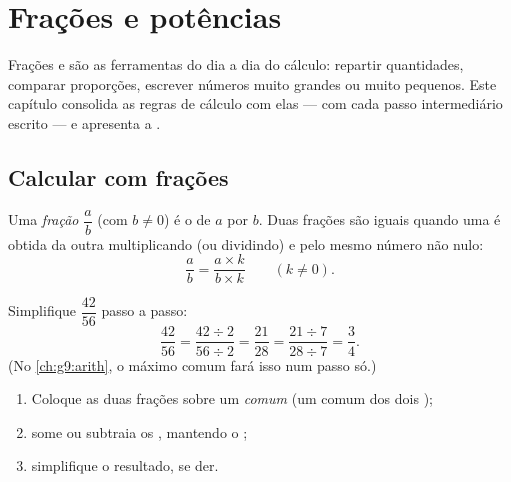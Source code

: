 \chapter{Frações e potências}\label{ch:g9:fractions}

Frações e  são as ferramentas do dia a dia do cálculo:
repartir quantidades, comparar proporções, escrever números muito
grandes ou muito pequenos. Este capítulo consolida as regras de cálculo
com elas --- com cada passo intermediário escrito --- e apresenta a
.

\section{Calcular com frações}

\begin{definition}[Fração]\label{def:g9:fractions:fraction}
Uma \emph{fração} $\dfrac ab$ (com $b \neq 0$) é o
 de $a$ por $b$. Duas frações são iguais quando uma é obtida
da outra multiplicando (ou dividindo)  e  pelo
mesmo número não nulo:
\[
\frac ab = \frac{a \times k}{b \times k} \qquad (k \neq 0).
\]
\end{definition}

\begin{example}\label{ex:g9:fractions:simplify}
Simplifique $\dfrac{42}{56}$ passo a passo:
\[
\frac{42}{56} = \frac{42 \div 2}{56 \div 2} = \frac{21}{28}
= \frac{21 \div 7}{28 \div 7} = \frac34 .
\]
(No \cref{ch:g9:arith}, o máximo  comum fará isso num passo
só.)
\end{example}

\begin{method}\label{met:g9:fractions:add}
\begin{enumerate}
  \item Coloque as duas frações sobre um \emph{ comum} (um
         comum dos dois );
  \item some ou subtraia os , mantendo o ;
  \item simplifique o resultado, se der.
\end{enumerate}
\end{method}

